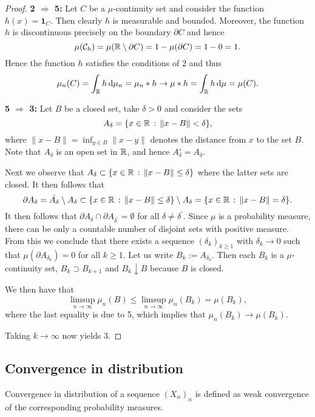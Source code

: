 \begin{proof}
\textbf{2 $\Rightarrow$ 5:} Let $C$ be a $\mu$-continuity set and consider the function $h(x) = \mathbf{1}_{C}$. Then clearly $h$ is measurable and bounded. Moreover, the function $h$ is discontinuous precisely on the boundary $\partial C$ and hence
\[
	\mu(\mathcal C_h) =\mu(\mathbb R \setminus \partial C) = 1 - \mu(\partial C) = 1-0 = 1.
\]
Hence the function $h$ satisfies the conditions of 2 and thus
\[
	\mu_n(C) = \int_{\mathbb R} h \, \mathrm{d} \mu_n = \mu_n \ast h \to \mu \ast h = \int_{\mathbb R} h \, \mathrm{d} \mu = \mu(C).
\]


\textbf{5 $\Rightarrow$ 3:} Let $B$ be a closed set, take $\delta > 0$ and consider the sets
\[
	A_\delta = \{x \in \mathbb R \, : \, \|x - B\| < \delta\},
\]
where $\|x - B\| = \inf_{y \in B} \|x - y\|$ denotes the distance from $x$ to the set $B$. Note that $A_\delta$ is an open set in $\mathbb R$, and hence $A_\delta^\circ = A_\delta$.

Next we observe that $A_\delta \subset \{x \in \mathbb R \, : \, \|x-B\| \le \delta\}$ where the latter sets are closed. It then follows that
\[
	\partial A_\delta = \bar{A_\delta} \setminus A_\delta \subset \{x \in \mathbb R \, : \, \|x-B\| \le \delta\} \setminus A_\delta = \{x \in \mathbb R \, : \, \|x-B\| = \delta\}.
\]
It then follows that $\partial A_\delta \cap \partial A_{\delta^\prime} = \emptyset$ for all $\delta \ne \delta^\prime$. Since $\mu$ is a probability measure, there can be only a countable number of disjoint sets with positive measure. From this we conclude that there exists a sequence $(\delta_k)_{k \ge 1}$ with $\delta_k \to 0$ such that $\mu(\partial A_{\delta_k}) = 0$ for all $k \ge 1$. Let us write $B_k := A_{\delta_k}$. Then each $B_k$ is a $\mu$-continuity set, $B_k \supset B_{k + 1}$ and $B_k \downarrow B$ because $B$ is closed.

We then have that
\[
	\limsup_{n \to \infty} \mu_n(B) \le \limsup_{n \to \infty} \mu_n(B_k) = \mu(B_k),
\]
where the last equality is due to 5, which implies that $\mu_n(B_k) \to \mu(B_k)$.

Taking $k \to \infty$ now yields 3.


\end{proof}

\subsection{Convergence in distribution}

Convergence in distribution of a sequence $(X_n)_{n }$ is defined as weak convergence of the corresponding probability measures.

